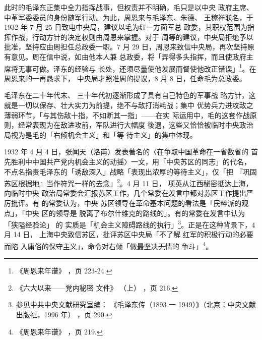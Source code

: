 此时的毛泽东正集中全力指挥战事，但权责并不明确，毛只是以中央
政府主席、中革军委委员的身份随军行动。为此，周恩来与毛泽东、朱德、
王稼祥联名，于 1932 年 7 月 25 日致电中央局，建议以毛为红一方面军总
政委，其职权范围为指挥作战，行动方针的决定权则由周恩来掌握。对于
周等的建议，中央局拒绝予以批准，坚持应由周担任总政委一职。7 月 29
日，周恩来致信中央局，再次坚持原有意见。周在信中说，如由他本人兼
总政委，将「弄得多头指挥，而且使政府主席将无事可做。泽东的经验与
长处，还须尽量使他发展而督使他改正错误」\footnote{《周恩来年谱》
，页 223-24.}。在周恩来的一再恳求下，
中央局才照准周的提议，8 月 8 日，任命毛为总政委。

毛泽东在二十年代末、
三十年代初逐渐形成了具有自己特色的军事战
略方针，这就是一切以保存、壮大实力为前提，绝不与敌打消耗战；集中
优势兵力进攻敌之薄弱环节，「与其伤敌十指，不如断其一指」——在实
际运用中，毛的这套作战原则，经常表现为在敌进攻前，军队进行大幅度
後退，这些又恰恰被临时中央政治局视为是毛的「右倾机会主义」和「等
待主义」的集中体现。

1932 年 4 月 4 日，张闻天（洛甫）发表著名的〈在争取中国革命在一省数省的
首先胜利中中国共产党内机会主义的动摇〉一文，用「中央苏区的同志」的代名，
不点名指责毛泽东的「诱敌深入」战略「表现出浓厚的等待主义」，仅「把
『巩固苏区根据地』当作符咒一样的去念」\footnote{ 《六大以来——党内秘密
文件》 （上） ，页 216.}。4 月 11 日， 项英从江西秘密抵达上海， 向临时中央
政治局常委会汇报苏区工作，几个常委在发言中都对苏区工作提出严厉批评。有
的常委认为，中央 苏区领导在革命基本问题的看法是「民粹派的观点」，「中央
区的领导是 脱离了布尔什维克的路线的」。有的常委在发言中认为「狭隘经验论」
的 实质是「机会主义障碍路线的执行」\footnote{参见中共中央文献研究室编：
《毛泽东传（1893 一 1949）》（北京：中央文献出版社，1996 年） ，页 290.
}。正是在这种背景下，4 月 14 日， 上海中央致信苏区，批评苏区中央局「不了解
红军的积极行动的必要而陷 入庸俗的保守主义」，命令对右倾「做最坚决无情的
争斗」\footnote{《周恩来年谱》 ，页 219.}。

